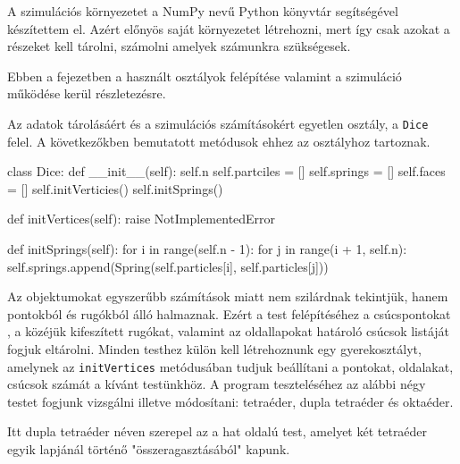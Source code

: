 
A szimulációs környezetet a NumPy \cite{harris2020array} nevű Python \cite{python} könyvtár segítségével készítettem el.
Azért előnyös saját környezetet létrehozni, mert így csak azokat a részeket kell tárolni, számolni amelyek számunkra szükségesek.

Ebben a fejezetben a használt osztályok felépítése valamint a szimuláció működése kerül részletezésre.


Az adatok tárolásáért és a szimulációs számításokért egyetlen osztály, a \texttt{Dice} felel.
A következőkben bemutatott metódusok ehhez az osztályhoz tartoznak.

\begin{python}
class Dice:
    def __init__(self):
        self.n
        self.partciles = []
        self.springs = []
        self.faces = []
        self.initVerticies()
        self.initSprings()

    def initVertices(self):
        raise NotImplementedError

    def initSprings(self):
        for i in range(self.n - 1):
            for j in range(i + 1, self.n):
                self.springs.append(Spring(self.particles[i],
                                           self.particles[j]))
\end{python}

Az objektumokat egyszerűbb számítások miatt nem szilárdnak tekintjük, hanem pontokból és rugókból álló halmaznak.
Ezért a test felépítéséhez a csúcspontokat , a közéjük kifeszített rugókat, valamint az oldallapokat határoló csúcsok listáját fogjuk eltárolni.
Minden testhez külön kell létrehoznunk egy gyerekosztályt, amelynek az \texttt{initVertices} metódusában tudjuk beállítani a pontokat, oldalakat, csúcsok számát a kívánt testünkhöz.
A program teszteléséhez az alábbi négy testet fogjunk vizsgálni illetve módosítani: tetraéder, dupla tetraéder és oktaéder.

\begin{remark}
Itt dupla tetraéder néven szerepel az a hat oldalú test, amelyet két tetraéder egyik lapjánál történő "összeragasztásából" kapunk.
\end{remark}

